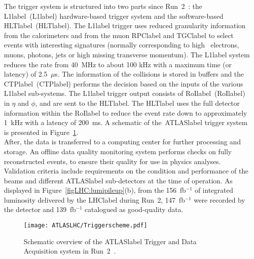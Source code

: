 The trigger system is structured into two parts since Run~2~\cite{Jenni:616089,Ruiz-Martinez:2133909}: the \acrlong{L1label}~(\acrshort{L1label}) hardware-based trigger system and the software-based \acrlong{HLTlabel}~(\acrshort{HLTlabel}). The \acrshort{L1label} trigger uses reduced granularity information from the calorimeters and from the muon \acrshort{RPClabel} and \acrshort{TGClabel} to select events with interesting signatures (normally corresponding to high \pT\ electrons, muons, photons, jets or high missing transverse momentum). The \acrshort{L1label} system reduces the rate from 40~MHz to about 100 kHz with a maximum time (or latency) of 2.5~$\mu$s. The information of the collisions is stored in buffers and the \acrlong{CTPlabel}~(\acrshort{CTPlabel}) performs the decision based on the inputs of the various \acrshort{L1label} sub-systems. The \acrshort{L1label} trigger output consists of \acrlong{RoIlabel}~(\acrshort{RoIlabel}) in $\eta$ and $\phi$, and are sent to the \acrshort{HLTlabel}. The \acrshort{HLTlabel} uses the full detector information within the \acrshort{RoIlabel} to reduce the event rate down to approximately 1~kHz with a latency of 200~ms. A schematic of the~\acrshort{ATLASlabel} trigger system is presented in Figure~\ref{figLHC:ATLASTDAQ}.\\

After, the data is transferred to a computing center for further processing and storage. An offline data quality monitoring system performs checks on fully reconstructed events, to ensure their quality for use in physics analyses. Validation criteria include requirements on the condition and performance of the beams and different \acrshort{ATLASlabel} sub-detectors at the time of operation. As displayed in Figure~\ref{figLHC:lumipileup}(b), from the 156~fb$^{-1}$ of integrated luminosity delivered by the \acrshort{LHClabel} during Run~2, 147~fb$^{-1}$ were recorded by the detector and 139~fb$^{-1}$ catalogued as good-quality data.

\begin{figure}[htbp]
    \RawFloats
    \begin{center}
    \texttt{[image: ATLASLHC/Triggerscheme.pdf]}
    \caption{
        Schematic overview of the \acrshort{ATLASlabel} Trigger and Data Acquisition system in Run~2~\cite{publicTDAQ}. 
    }
    \label{figLHC:ATLASTDAQ}
    \end{center}
\end{figure}